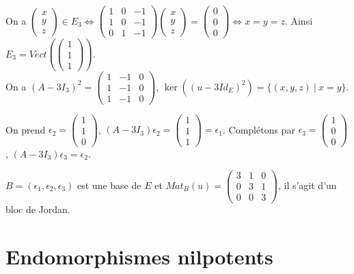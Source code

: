 \documentclass[a4paper,10pt]{book} %
\newcommand{\tq}{~|~}
\begin{document}
On a $\begin{pmatrix}x\\y\\z\end{pmatrix}\in E_3\Leftrightarrow \begin{pmatrix}
1&0&-1\\1&0&-1\\0&1&-1
\end{pmatrix}\begin{pmatrix}
x\\y\\z
\end{pmatrix}=\begin{pmatrix}
0\\0\\0
\end{pmatrix}\Leftrightarrow x=y=z$.
Ainsi $E_3=Vect(\begin{pmatrix}
1\\1\\1
\end{pmatrix})$.\\

On a $(A-3I_3)^2=\begin{pmatrix}
1&-1&0\\
1&-1&0\\
1&-1&0
\end{pmatrix}$, $\ker((u-3Id_E)^2)=\{(x,y,z)\tq x=y\}$.

On prend $\epsilon_2=\begin{pmatrix}
1\\1\\0
\end{pmatrix}$,
$(A-3I_3)\epsilon_2=\begin{pmatrix}
1\\1\\1
\end{pmatrix}=\epsilon_1$.
Complétons par $\epsilon_3=\begin{pmatrix}
1\\0\\0
\end{pmatrix}$, $(A-3I_3)\epsilon_3=\epsilon_2$.

$B=(\epsilon_1,\epsilon_2,\epsilon_3)$ est une base de $E$ et $Mat_B(u)=\begin{pmatrix}
3&1&0\\0&3&1\\0&0&3
\end{pmatrix}$, il s'agit d'un bloc de Jordan.

\section{Endomorphismes nilpotents}
\end{document}
